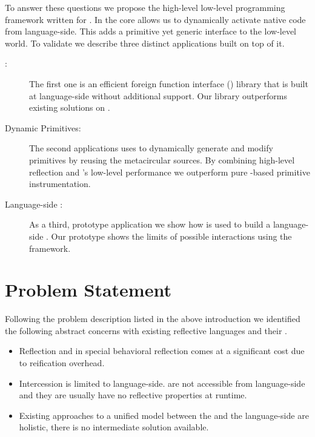 To answer these questions we propose the high-level low-level programming framework \B written for \PH.
In the core \B allows us to dynamically activate native code from language-side.
This adds a primitive yet generic interface to the low-level \VM world.
To validate \B we describe three distinct applications built on top of it.
%
\begin{description}
	\item[\FFI:] The first one is an efficient foreign function interface (\FFI) library that is built at language-side without additional \VM support.
	Our \FFI library outperforms existing solutions on \PH.
	
	\item[Dynamic Primitives:] The second applications uses \B to dynamically generate and modify \PH primitives by reusing the metacircular \VM sources.
	By combining high-level reflection and \B's low-level performance we outperform pure \PH-based primitive instrumentation.

	\item[Language-side \JIT:] As a third, prototype application we show how \B is used to build a language-side \JIT.
	Our prototype shows the limits of possible \VM interactions using the \B framework. 
\end{description}


\section{Problem Statement}
Following the problem description listed in the above introduction we identified the following abstract concerns with existing reflective languages and their \VMs.
%
\begin{itemize}
	\item Reflection and in special behavioral reflection comes at a significant cost due to reification overhead.
		
	\item Intercession is limited to language-side.
	\VMs are not accessible from language-side and they are usually have no reflective properties at runtime. 
	
	\item Existing approaches to a unified model between the \VM and the language-side are holistic, there is no intermediate solution available.
\end{itemize}

